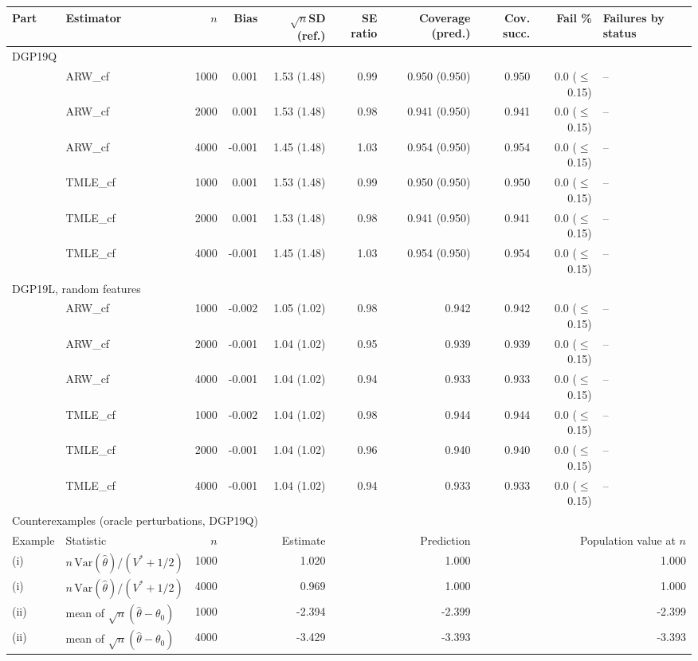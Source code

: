 \begin{tabular}{llrrrrrrrl}
\hline
Part & Estimator & $n$ & Bias & $\sqrt{n}$SD (ref.) & SE ratio & Coverage (pred.) & Cov. succ. & Fail \% & Failures by status \\
\hline
\multicolumn{10}{l}{DGP19Q} \\
 & ARW\_cf & 1000 & 0.001 & 1.53 (1.48) & 0.99 & 0.950 (0.950) & 0.950 & 0.0 ($\le$0.15) & -- \\
 & ARW\_cf & 2000 & 0.001 & 1.53 (1.48) & 0.98 & 0.941 (0.950) & 0.941 & 0.0 ($\le$0.15) & -- \\
 & ARW\_cf & 4000 & -0.001 & 1.45 (1.48) & 1.03 & 0.954 (0.950) & 0.954 & 0.0 ($\le$0.15) & -- \\
 & TMLE\_cf & 1000 & 0.001 & 1.53 (1.48) & 0.99 & 0.950 (0.950) & 0.950 & 0.0 ($\le$0.15) & -- \\
 & TMLE\_cf & 2000 & 0.001 & 1.53 (1.48) & 0.98 & 0.941 (0.950) & 0.941 & 0.0 ($\le$0.15) & -- \\
 & TMLE\_cf & 4000 & -0.001 & 1.45 (1.48) & 1.03 & 0.954 (0.950) & 0.954 & 0.0 ($\le$0.15) & -- \\
\multicolumn{10}{l}{DGP19L, random features} \\
 & ARW\_cf & 1000 & -0.002 & 1.05 (1.02) & 0.98 & 0.942 & 0.942 & 0.0 ($\le$0.15) & -- \\
 & ARW\_cf & 2000 & -0.001 & 1.04 (1.02) & 0.95 & 0.939 & 0.939 & 0.0 ($\le$0.15) & -- \\
 & ARW\_cf & 4000 & -0.001 & 1.04 (1.02) & 0.94 & 0.933 & 0.933 & 0.0 ($\le$0.15) & -- \\
 & TMLE\_cf & 1000 & -0.002 & 1.04 (1.02) & 0.98 & 0.944 & 0.944 & 0.0 ($\le$0.15) & -- \\
 & TMLE\_cf & 2000 & -0.001 & 1.04 (1.02) & 0.96 & 0.940 & 0.940 & 0.0 ($\le$0.15) & -- \\
 & TMLE\_cf & 4000 & -0.001 & 1.04 (1.02) & 0.94 & 0.933 & 0.933 & 0.0 ($\le$0.15) & -- \\
\hline
\multicolumn{10}{l}{Counterexamples (oracle perturbations, DGP19Q)} \\
Example & Statistic & $n$ & \multicolumn{2}{r}{Estimate} & \multicolumn{2}{r}{Prediction} & \multicolumn{3}{r}{Population value at $n$} \\
\hline
(i) & $n\,\mathrm{Var}(\widehat\theta)/(V^*+1/2)$ & 1000 & \multicolumn{2}{r}{1.020} & \multicolumn{2}{r}{1.000} & \multicolumn{3}{r}{1.000} \\
(i) & $n\,\mathrm{Var}(\widehat\theta)/(V^*+1/2)$ & 4000 & \multicolumn{2}{r}{0.969} & \multicolumn{2}{r}{1.000} & \multicolumn{3}{r}{1.000} \\
(ii) & mean of $\sqrt{n}(\widehat\theta-\theta_0)$ & 1000 & \multicolumn{2}{r}{-2.394} & \multicolumn{2}{r}{-2.399} & \multicolumn{3}{r}{-2.399} \\
(ii) & mean of $\sqrt{n}(\widehat\theta-\theta_0)$ & 4000 & \multicolumn{2}{r}{-3.429} & \multicolumn{2}{r}{-3.393} & \multicolumn{3}{r}{-3.393} \\
\hline
\end{tabular}
